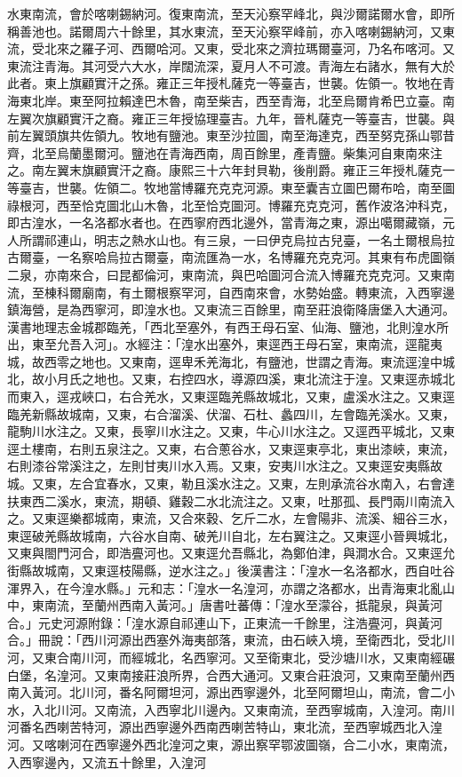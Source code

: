 \begin{pinyinscope}
水東南流，會於喀喇錫納河。復東南流，至天沁察罕峰北，與沙爾諾爾水會，即所稱善池也。諾爾周六十餘里，其水東流，至天沁察罕峰前，亦入喀喇錫納河，又東流，受北來之羅子河、西爾哈河。又東，受北來之濟拉瑪爾臺河，乃名布喀河。又東流注青海。其河受六大水，岸闊流深，夏月人不可渡。青海左右諸水，無有大於此者。東上旗顧實汗之孫。雍正三年授札薩克一等臺吉，世襲。佐領一。牧地在青海東北岸。東至阿拉賴達巴木魯，南至柴吉，西至青海，北至烏爾肯希巴立臺。南左翼次旗顧實汗之裔。雍正三年授協理臺吉。九年，晉札薩克一等臺吉，世襲。與前左翼頭旗共佐領九。牧地有鹽池。東至沙拉圖，南至海達克，西至努克孫山鄂昔齊，北至烏蘭墨爾河。鹽池在青海西南，周百餘里，產青鹽。柴集河自東南來注之。南左翼末旗顧實汗之裔。康熙三十六年封貝勒，後削爵。雍正三年授札薩克一等臺吉，世襲。佐領二。牧地當博羅充克克河源。東至囊吉立圖巴爾布哈，南至圖祿根河，西至恰克圖北山木魯，北至恰克圖河。博羅充克克河，舊作波洛沖科克，即古湟水，一名洛都水者也。在西寧府西北邊外，當青海之東，源出噶爾藏嶺，元人所謂祁連山，明志之熱水山也。有三泉，一曰伊克烏拉古兒臺，一名土爾根烏拉古爾臺，一名察哈烏拉古爾臺，南流匯為一水，名博羅充克克河。其東有布虎圖嶺二泉，亦南來合，曰昆都倫河，東南流，與巴哈圖河合流入博羅充克克河。又東南流，至棟科爾廟南，有土爾根察罕河，自西南來會，水勢始盛。轉東流，入西寧邊鎮海營，是為西寧河，即湟水也。又東流三百餘里，南至莊浪衛降唐堡入大通河。漢書地理志金城郡臨羌，「西北至塞外，有西王母石室、仙海、鹽池，北則湟水所出，東至允吾入河」。水經注：「湟水出塞外，東逕西王母石室，東南流，逕龍夷城，故西零之地也。又東南，逕卑禾羌海北，有鹽池，世謂之青海。東流逕湟中城北，故小月氏之地也。又東，右控四水，導源四溪，東北流注于湟。又東逕赤城北而東入，逕戎峽口，右合羌水，又東逕臨羌縣故城北，又東，盧溪水注之。又東逕臨羌新縣故城南，又東，右合溜溪、伏溜、石杜、蠡四川，左會臨羌溪水。又東，龍駒川水注之。又東，長寧川水注之。又東，牛心川水注之。又逕西平城北，又東逕土樓南，右則五泉注之。又東，右合蔥谷水，又東逕東亭北，東出漆峽，東流，右則漆谷常溪注之，左則甘夷川水入焉。又東，安夷川水注之。又東逕安夷縣故城。又東，左合宜春水，又東，勒且溪水注之。又東，左則承流谷水南入，右會達扶東西二溪水，東流，期頓、雞穀二水北流注之。又東，吐那孤、長門兩川南流入之。又東逕樂都城南，東流，又合來穀、乞斤二水，左會陽非、流溪、細谷三水，東逕破羌縣故城南，六谷水自南、破羌川自北，左右翼注之。又東逕小晉興城北，又東與閤門河合，即浩亹河也。又東逕允吾縣北，為鄭伯津，與澗水合。又東逕允街縣故城南，又東逕枝陽縣，逆水注之。」後漢書注：「湟水一名洛都水，西自吐谷渾界入，在今湟水縣。」元和志：「湟水一名湟河，亦謂之洛都水，出青海東北亂山中，東南流，至蘭州西南入黃河。」唐書吐蕃傳：「湟水至濛谷，抵龍泉，與黃河合。」元史河源附錄：「湟水源自祁連山下，正東流一千餘里，注浩亹河，與黃河合。」冊說：「西川河源出西塞外海夷部落，東流，由石峽入境，至衛西北，受北川河，又東合南川河，而經城北，名西寧河。又至衛東北，受沙塘川水，又東南經碾白堡，名湟河。又東南接莊浪所界，合西大通河。又東合莊浪河，又東南至蘭州西南入黃河。北川河，番名阿爾坦河，源出西寧邊外，北至阿爾坦山，南流，會二小水，入北川河。又南流，入西寧北川邊內。又東南流，至西寧城南，入湟河。南川河番名西喇苦特河，源出西寧邊外西南西喇苦特山，東北流，至西寧城西北入湟河。又喀喇河在西寧邊外西北湟河之東，源出察罕鄂波圖嶺，合二小水，東南流，入西寧邊內，又流五十餘里，入湟河
\end{pinyinscope}
